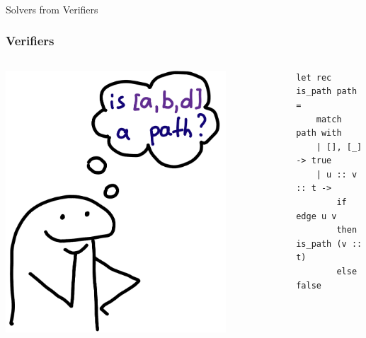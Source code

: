 \documentclass[xcolor={dvipsnames}, aspectratio=169]{beamer}
\begin{document}
\begin{frame}[fragile]
  \frametitle{}

\begin{center}
  \Large Solvers from Verifiers
\end{center}

\end{frame}

\begin{frame}[fragile]
  \frametitle{Verifiers}
  \begin{columns}    
    \begin{column}{0.35\textwidth}
      \centering
      \includegraphics[width=0.8\textwidth]{pic/verifier.jpg}
    \end{column}
    \begin{column}{0.75\textwidth} 
      \begin{center}
        \begin{minipage}{0.82\textwidth}
      \begin{lstlisting}[language=ocanren]
  let rec is_path path =
    match path with 
    | [], [_] -> true 
    | u :: v :: t -> 
        if edge u v 
        then is_path (v :: t)
        else false 
      \end{lstlisting}
    \end{minipage}
  \end{center}      
    \end{column}
  \end{columns}
\end{frame}
\end{document}
